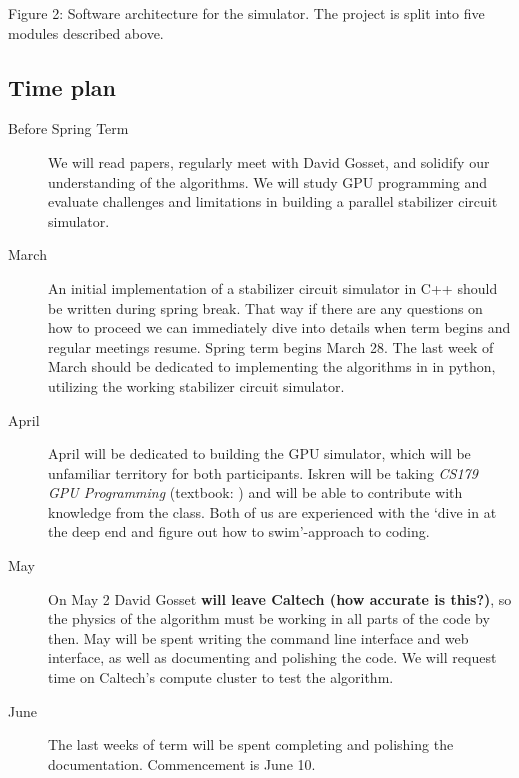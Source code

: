 \documentclass[11pt]{article}
\begin{document}
\begin{multicols}{2}
\begin{Figure}
\vspace{-0.5in}

{Figure 2: Software architecture for the simulator. The project is split into five modules described above.}
\end{Figure}

\clearpage

\end{multicols}

\subsection*{Time plan}
\begin{description}
    \item[Before Spring Term] We will read papers, regularly meet with David Gosset, and solidify our understanding of the algorithms. We will study GPU programming and evaluate challenges and limitations in building a parallel stabilizer circuit simulator.
    \item[March] An initial implementation of a stabilizer circuit simulator in C++ should be written during spring break. That way if there are any questions on how to proceed we can immediately dive into details when term begins and regular meetings resume. Spring term begins March 28. The last week of March should be dedicated to implementing the algorithms in \cite{bravyi-gosset} in python, utilizing the working stabilizer circuit simulator.
    \item[April] April will be dedicated to building the GPU simulator, which will be unfamiliar territory for both participants. Iskren will be taking \textit{CS179 GPU Programming} (textbook: \cite{cudahandbook}) and will be able to contribute with knowledge from the class. Both of us are experienced with the `dive in at the deep end and figure out how to swim'-approach to coding.
    \item[May] On May 2 David Gosset \textbf{will leave Caltech (how accurate is this?)}, so the physics of the algorithm must be working in all parts of the code by then. May will be spent writing the command line interface and web interface, as well as documenting and polishing the code. We will request time on Caltech's compute cluster to test the algorithm. 
    \item[June] The last weeks of term will be spent completing and polishing the documentation. Commencement is June 10.

\end{description}
\end{document}

